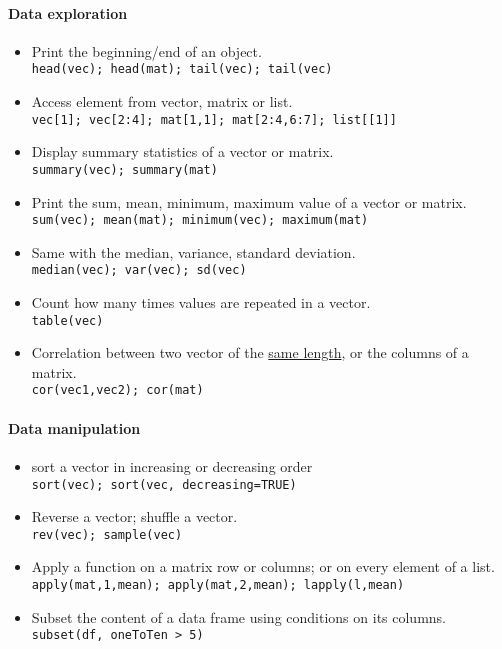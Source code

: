 \documentclass[a4paper,11pt]{article}
\begin{document}
\paragraph{Data exploration} 
\begin{itemize} 
\item Print the beginning/end of an object.\\ 
  \verb!head(vec); head(mat); tail(vec); tail(vec)!
\item Access element from vector, matrix or list.\\ 
  \verb!vec[1]; vec[2:4]; mat[1,1]; mat[2:4,6:7]; list[[1]]!
\item Display summary statistics of a vector or matrix.\\ 
  \verb!summary(vec); summary(mat)!
\item Print the sum, mean, minimum, maximum value of a vector or matrix.\\ 
  \verb!sum(vec); mean(mat); minimum(vec); maximum(mat)!
\item Same with the median, variance, standard deviation.\\ 
  \verb!median(vec); var(vec); sd(vec) !
\item Count how many times values are repeated in a vector.\\ 
  \verb!table(vec)!
\item Correlation between two vector of the \uline{same length}, or the columns of a matrix.\\ 
  \verb!cor(vec1,vec2); cor(mat)!
\end{itemize}


\paragraph{Data manipulation}
\begin{itemize} 
  \item sort a vector in increasing or decreasing order \\ 
    \verb!sort(vec); sort(vec, decreasing=TRUE)!
  \item Reverse a vector; shuffle a vector. \\ 
    \verb!rev(vec); sample(vec)!
  \item Apply a function on a matrix row or columns; or on every element of a list. \\ 
    \verb!apply(mat,1,mean); apply(mat,2,mean); lapply(l,mean)!
  \item Subset the content of a data frame using conditions on its columns. \\ 
    \verb!subset(df, oneToTen > 5)!
\end{itemize}
\end{document}
